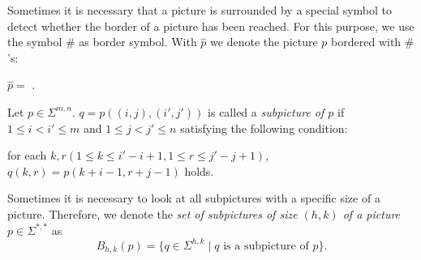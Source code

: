 Sometimes it is necessary that a picture is surrounded by a special symbol to detect whether the
border of a picture has been reached. For this purpose, we use the symbol $\#$ as border symbol.
With $\hat{p}$ we denote the picture $p$ bordered with $\#$'s:
\begin{center}
	$\hat{p} =$ .
\end{center} 
\begin{definition}
	Let $p \in \Sigma^{m,n}$. $q = p((i, j), (i', j'))$ is called a \emph{subpicture of $p$} if
	$1 \leq i < i' \leq m$ and $1 \leq j < j' \leq n$
	satisfying the following condition:
	\begin{compactitem}
	   \item for each $k, r (1 \leq k \leq i' - i + 1, 1 \leq r \leq j'- j + 1)$, $q(k, r) = p(k
                + i - 1, r + j - 1)$ holds.
	\end{compactitem}
\end{definition}

Sometimes it is necessary to look at all subpictures with a specific size of a picture.
Therefore, we denote the \emph{set of subpictures of size $(h, k)$ of a picture $p\in \Sigma^{*,*}$}
as 
\[B_{h, k}(p) = \{q \in \Sigma^{h,k} \mid q \text{ is a subpicture of } p\}.\] 

